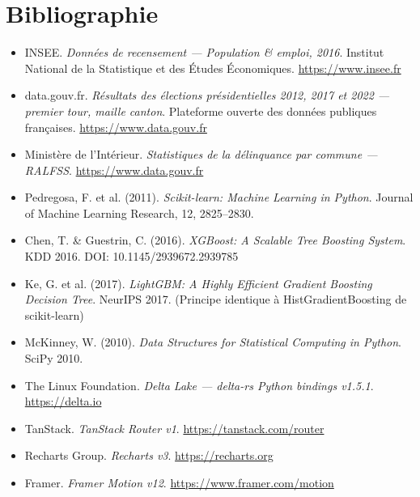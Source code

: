 \documentclass[12pt,a4paper,oneside]{report}
\begin{document}
\chapter*{Bibliographie}

\begin{itemize}
  \item INSEE. \textit{Données de recensement — Population \& emploi, 2016}. Institut National de la Statistique et des Études Économiques. \url{https://www.insee.fr}

  \item data.gouv.fr. \textit{Résultats des élections présidentielles 2012, 2017 et 2022 — premier tour, maille canton}. Plateforme ouverte des données publiques françaises. \url{https://www.data.gouv.fr}

  \item Ministère de l'Intérieur. \textit{Statistiques de la délinquance par commune — RALFSS}. \url{https://www.data.gouv.fr}

  \item Pedregosa, F. et al. (2011). \textit{Scikit-learn: Machine Learning in Python}. Journal of Machine Learning Research, 12, 2825--2830.

  \item Chen, T. \& Guestrin, C. (2016). \textit{XGBoost: A Scalable Tree Boosting System}. KDD 2016. DOI: 10.1145/2939672.2939785

  \item Ke, G. et al. (2017). \textit{LightGBM: A Highly Efficient Gradient Boosting Decision Tree}. NeurIPS 2017. (Principe identique à HistGradientBoosting de scikit-learn)

  \item McKinney, W. (2010). \textit{Data Structures for Statistical Computing in Python}. SciPy 2010.

  \item The Linux Foundation. \textit{Delta Lake — delta-rs Python bindings v1.5.1}. \url{https://delta.io}

  \item TanStack. \textit{TanStack Router v1}. \url{https://tanstack.com/router}

  \item Recharts Group. \textit{Recharts v3}. \url{https://recharts.org}

  \item Framer. \textit{Framer Motion v12}. \url{https://www.framer.com/motion}
\end{itemize}
\end{document}
